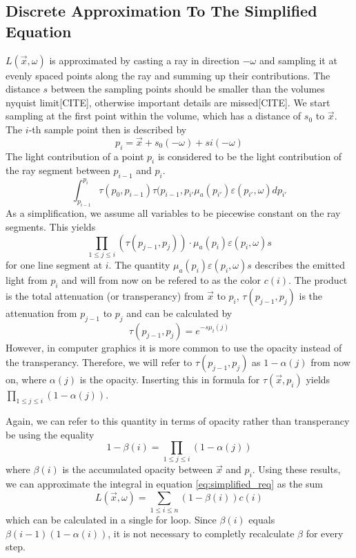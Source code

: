 \subsection{Discrete Approximation To The Simplified Equation}
$L(\vec{x},\omega )$ is approximated by casting a ray in direction $-\omega$ and sampling it at evenly spaced points along the ray and summing up their contributions\cite{511}. The distance $s$ between the sampling points should be smaller than the volumes nyquist limit[CITE], otherwise important details are missed[CITE].
We start sampling at the first point within the volume, which has a distance of $s_0$ to $\vec{x}$. The $i$-th sample point then is described by
\begin{equation}
p_i=\vec{x} + s_0(-\omega) + si(-\omega)
\end{equation}
The light contribution of a point $p_i$ is considered to be the light contribution of the ray segment between $p_{i-1}$ and $p_i$.
\begin{equation}
\int_{p_{i-1}}^{p_i} \tau (p_0,p_{i-1}) \tau(p_{i-1},p_{i'} \mu_a(p_{i'})\varepsilon (p_{i'}, \omega)dp_{i'}
\end{equation} 
As a simplification, we assume all variables to be piecewise constant\cite{10.1145/147130.147155} on the ray segments. This yields
\begin{equation}
{\prod_{1\le j \le i}{(\tau(p_{j-1}, p_j))} \cdot \mu_a(p_{i})\varepsilon (p_{i}, \omega)s}
\end{equation} 
for one line segment at $i$.
The quantity $\mu_a(p_{i})\varepsilon (p_{i}, \omega)s$ describes the emitted light from $p_i$ and will from now on be refered to as the color $c(i)$. The product is the total attenuation (or transperancy) from $\vec{x}$ to $p_i$, $\tau(p_{j-1}, p_j)$ is the attenuation from $p_{j-1}$ to $p_j$ and can be calculated by
\begin{equation}
\tau(p_{j-1}, p_j) = e^{-s\mu_t(j)}
\end{equation}
However, in computer graphics it is more common to use the opacity instead of the transperancy. Therefore, we will refer to $\tau(p_{j-1}, p_j)$ as $1 - \alpha(j)$ from now on, where $\alpha(j)$ is the opacity. Inserting this in formula for $\tau(\vec{x}, p_i)$ yields $\prod_{1 \le j \le i} (1 - \alpha(j))$.

Again, we can refer to this quantity in terms of opacity rather than transperancy be using the equality
\begin{equation}
1 - \beta(i) = \prod_{1 \le j \le i} (1 - \alpha(j))
\end{equation}
where $\beta(i)$ is the accumulated opacity between $\vec{x}$ and $p_i$.
Using these results, we can approximate the integral in equation \ref{eq:simplified_req} as the sum
\begin{equation} \label{eq:discrete_approximation}
L(\vec{x},\omega) = \sum_{1 \le i \le n}(1 - \beta(i))c(i)
\end{equation}
which can be calculated in a single for loop. Since $\beta(i)$ equals $\beta(i-1)(1-\alpha(i))$, it is not necessary to completly recalculate $\beta$ for every step\cite{10.1145/147130.147155}.


